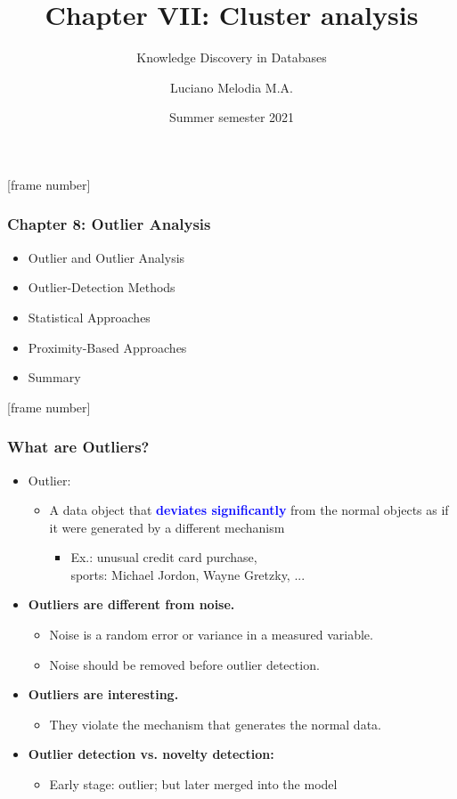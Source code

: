 \documentclass[aspectratio=169,t,xcolor=dvipsnames]{beamer}
\title[KDD]{Chapter VII: Cluster analysis}
\subtitle{Knowledge Discovery in Databases}
\author[L.~Melodia]{Luciano Melodia M.A.}
\institute[Department]{Evolutionary Data Management, Friedrich-Alexander University Erlangen-Nürnberg}
\date{Summer semester 2021}
\newcommand{\blue}[1]{\textbf{\textcolor{blue}{#1}}}
\begin{document}
\def\tikzoverlay{%
   \tikz[baseline,overlay]\node[every overlay node]
}%

  \maketitle
{  [frame number]  
\begin{frame}
	\frametitle{Chapter 8: Outlier Analysis}
	\begin{itemize}
		\item \alert{Outlier and Outlier Analysis}
		\item Outlier-Detection Methods
		\item Statistical Approaches
		\item Proximity-Based Approaches
		\item Summary
	\end{itemize}
\end{frame}
}
  
{  [frame number]
\begin{frame}
   \frametitle{What are Outliers?}
   \begin{itemize}
   	\item \alert{Outlier}:
   	\begin{itemize}
   		\item A data object that \blue{deviates significantly} from the normal objects as if it were generated by a different mechanism
 		\begin{itemize}
 			\item Ex.: unusual credit card purchase,\\
 			sports: Michael Jordon, Wayne Gretzky, ...
 		\end{itemize}
   	\end{itemize}
   	
	\item \textbf{Outliers are different from noise.}
		\begin{itemize}
			\item Noise is a random error or variance in a measured variable.
			\item Noise should be removed before outlier detection.	
		\end{itemize}

	\item \textbf{Outliers are interesting.}
		\begin{itemize}
			\item They violate the mechanism that generates the normal data.
		\end{itemize}
	\item \textbf{Outlier detection vs. novelty detection:}
		\begin{itemize}
			\item Early stage: outlier; but later merged into the model
   		\end{itemize}
   \end{itemize}
\end{frame}
}
\end{document}
